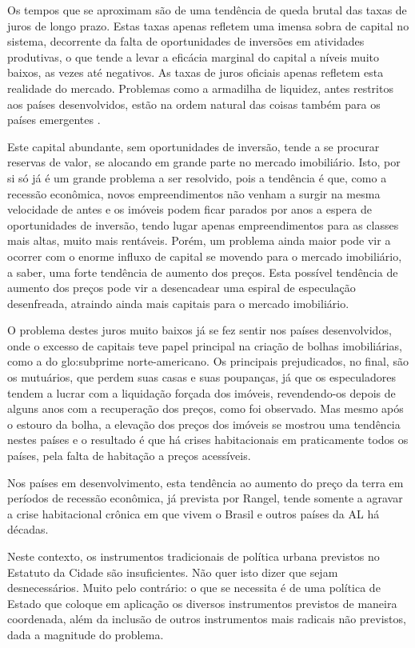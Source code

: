 \documentclass[
	12pt,				%
	oneside,			%
	a4paper,			%
	chapter=TITLE,		%
	section=TITLE,		%
	english,			%
	brazil				%
	]{abntex2}
\begin{document}
Os tempos que se aproximam são de uma tendência de queda brutal das taxas de
juros de longo prazo. Estas taxas apenas refletem uma imensa sobra de capital no
sistema, decorrente da falta de oportunidades de inversões em atividades
produtivas, o que tende a levar a eficácia marginal do capital a níveis muito
baixos, as vezes até negativos. As taxas de juros oficiais apenas refletem esta
realidade do mercado. Problemas como a armadilha de liquidez, antes restritos
aos países desenvolvidos, estão na ordem natural das coisas também para os
países emergentes \autocite{krugman-emergentes}.

Este capital abundante, sem oportunidades de inversão, tende a se procurar
reservas de valor, se alocando em grande parte no mercado imobiliário. Isto, por
si só já é um grande problema a ser resolvido, pois a tendência é que, como a
recessão econômica, novos empreendimentos não venham a surgir na mesma
velocidade de antes e os imóveis podem ficar parados por anos a espera de
oportunidades de inversão, tendo lugar apenas empreendimentos para as classes
mais altas, muito mais rentáveis. Porém, um problema ainda maior pode vir a
ocorrer com o enorme influxo de capital se movendo para o mercado imobiliário, a
saber, uma forte tendência de aumento dos preços. Esta possível tendência de
aumento dos preços pode vir a desencadear uma espiral de especulação
desenfreada, atraindo ainda mais capitais para o mercado imobiliário.

O problema destes juros muito baixos já se fez sentir nos países desenvolvidos,
onde o excesso de capitais teve papel principal na criação de bolhas
imobiliárias, como a do \gls{glo:subprime} norte-americano. Os principais prejudicados,
no final, são os mutuários, que perdem suas casas e suas poupanças, já que os
especuladores tendem a lucrar com a liquidação forçada dos imóveis,
revendendo-os depois de alguns anos com a recuperação dos preços, como foi
observado. Mas mesmo após o estouro da bolha, a elevação dos preços dos imóveis
se mostrou uma tendência nestes países e o resultado é que há crises
habitacionais em praticamente todos os países, pela falta de habitação a preços
acessíveis.

Nos países em desenvolvimento, esta tendência ao aumento do preço da terra em
períodos de recessão econômica, já prevista por Rangel, tende somente a agravar
a crise habitacional crônica em que vivem o Brasil e outros países da \gls{AL}
há décadas.

Neste contexto, os instrumentos tradicionais de política urbana previstos no
Estatuto da Cidade são insuficientes. Não quer isto dizer que sejam
desnecessários. Muito pelo contrário: o que se necessita é de uma política
de Estado que coloque em aplicação os diversos instrumentos previstos de maneira
coordenada, além da inclusão de outros instrumentos mais radicais não previstos,
dada a magnitude do problema.
\end{document}
